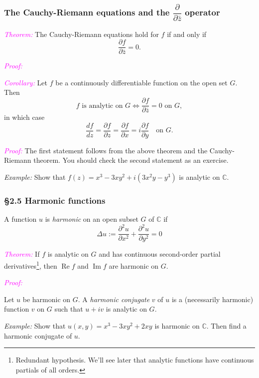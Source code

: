 \documentclass[xcolor={dvipsnames}]{beamer}
\newcommand{\CC}{\mathbb{C}}
\newcommand{\pd}[2]{\dfrac{\partial#1}{\partial#2}}
\newcommand{\df}[1]{\textcolor{BrickRed}{\emph{#1}}}
\renewcommand{\th}[1]{\textcolor{Fuchsia}{\emph{#1}}}
\renewcommand{\Re}{\operatorname{Re}}
\renewcommand{\Im}{\operatorname{Im}}
\begin{document}
\begin{frame}[t]
    \frametitle{The Cauchy-Riemann equations and the $\pd{}{\bar z}$ operator}

    \bigskip\th{Theorem:} The Cauchy-Riemann equations hold for $f$ if and only if
    \[
        \pd{f}{\bar z}=0.
    \]

    \th{Proof:}
\end{frame}

\begin{frame}
    \th{Corollary:}
    Let $f$ be a continuously differentiable function on the open set $G$. Then
    \[
        \text{$f$ is analytic on $G$}\Longleftrightarrow\text{$\pd{f}{\bar z}=0$ on $G$},
    \]
    in which case
    \[
        \frac{df}{dz} = \pd{f}{z} = \pd{f}x = i\pd{f}y\quad\text{on $G$}.
    \]

    \bigskip\th{Proof:}
    The first statement follows from the above theorem and the Cauchy-Riemann theorem.
    You should check the second statement as an exercise.


\end{frame}

\begin{frame}[t]
    \emph{Example:} Show that $f(z)=x^3 - 3xy^2 + i(3x^2y - y^3)$ is analytic on $\CC$.
\end{frame}

\begin{frame}[t]
    \frametitle{\S2.5 Harmonic functions}

    A function $u$ is \df{harmonic} on an open subset $G$ of $\CC$ if
    \[
        \Delta u := \frac{\partial^2u}{\partial x^2} + \frac{\partial^2u}{\partial y^2} = 0
    \]

    \th{Theorem:} 
    If $f$ is analytic on $G$ and has continuous second-order partial derivatives\footnote{Redundant hypothesis. We'll see later that analytic functions have continuous partials of all orders.}, then $\Re f$ and $\Im f$ are harmonic on $G$.

    \bigskip\th{Proof:}
\end{frame}

\begin{frame}[t]
Let $u$ be harmonic on $G$. A \df{harmonic conjugate} $v$ of $u$ is a (necessarily harmonic) function $v$ on $G$ such that
$u+iv$ is analytic on $G$.

\bigskip
\emph{Example:}
Show that $u(x,y)=x^3 - 3xy^2 +2xy$ is harmonic on $\CC$. Then find a harmonic conjugate of $u$.
\end{frame}
\end{document}
